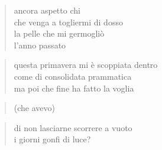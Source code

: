 \clearpage


\begin{verse}
    ancora aspetto chi\\
    che venga a togliermi di dosso\\
    la pelle che mi germogliò\\
    l'anno passato
\end{verse}

\clearpage


\begin{verse}
    questa primavera mi è scoppiata dentro\\
    come di consolidata prammatica\\
    ma poi che fine ha fatto la voglia
\end{verse}

\begin{verse}
    (che avevo)
\end{verse}

\begin{verse}
    di non lasciarne scorrere a vuoto\\
    i giorni gonfi di luce?
\end{verse}
